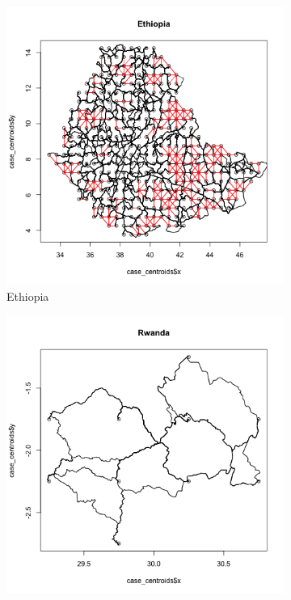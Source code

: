 \documentclass[11pt, oneside]{article}   	%
\begin{document}
\begin{figure}[p]
\begin{subfigure}[c]{0.43\textwidth}
\includegraphics[width=\textwidth, trim={1cm 1cm 0cm 2cm},clip]{../../Build/output/Road_Networks/network_Ethiopia.png}
\caption{Ethiopia}
\label{fig:Ethiopia_roads}
\end{subfigure}
\begin{subfigure}[c]{0.43\textwidth}
\includegraphics[width=\textwidth, trim={1cm 1cm 0cm 2cm},clip]{../../Build/output/Road_Networks/network_Rwanda.png}

\end{subfigure}
\end{figure}
\end{document}
